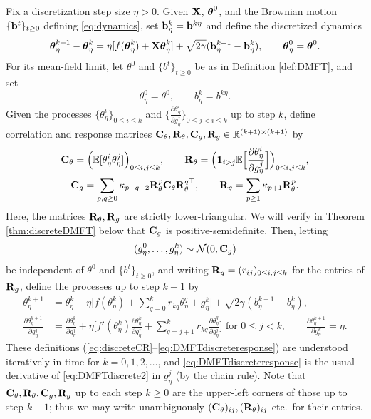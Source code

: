 Fix a discretization step size $\eta>0$. Given $\mathbf{X}$, $\boldsymbol{\theta}^0$, and the
Brownian motion $\{\mathbf{b}^t\}_{t \geq 0}$ defining \eqref{eq:dynamics},
set $\mathbf{b}_\eta^k=\mathbf{b}^{k\eta}$ and define the discretized dynamics 
\begin{equation}\label{eq:disc-Langevin}
\boldsymbol{\theta}^{k+1}_\eta-\boldsymbol{\theta}^{k}_\eta=\eta[f(\boldsymbol{\theta}^{k}_\eta)+\mathbf{X}\boldsymbol{\theta}^{k}_\eta]
+ \sqrt{2\gamma} (\mathbf{b}^{k+1}_\eta - \mathbf{b}^{k}_\eta),
\qquad \boldsymbol{\theta}_\eta^0=\boldsymbol{\theta}^0.
\end{equation}
For its mean-field limit, let $\theta^0$ and $\{b^t\}_{t \geq 0}$ be as in
Definition \ref{def:DMFT}, and set
\[\theta_\eta^0=\theta^0, \qquad b_\eta^k=b^{k\eta}.\]
Given the processes $\{\theta_\eta^i\}_{0 \leq i \leq k}$
and $\{\frac{\partial \theta_\eta^i}{\partial g_\eta^j}\}_{0 \leq j<i \leq k}$
up to step $k$, define correlation and response matrices 
$\mathbf{C}_\theta,\mathbf{R}_\theta,\mathbf{C}_g,\mathbf{R}_g \in \mathbb{R}^{(k+1) \times (k+1)}$ by
\begin{equation}\label{eq:discreteCR}
\begin{gathered}
\mathbf{C}_\theta=\Big(\mathbb{E}[\theta^{i}_\eta\theta^{j}_\eta]\Big)_{0 \leq i,j \leq k},
\qquad \mathbf{R}_\theta=\Big(\mathbf{1}_{i>j}\mathbb{E}\Big[\frac{\partial
\theta^i_\eta}{\partial g^j_\eta}\Big]\Big)_{0 \leq i,j \leq k},\\
\mathbf{C}_g=\sum_{p,q\ge 0} \kappa_{p+q+2}
\mathbf{R}_\theta^p\mathbf{C}_\theta\mathbf{R}_\theta^{q\top},
\qquad \mathbf{R}_g=\sum_{p \geq 1} \kappa_{p+1}\mathbf{R}_\theta^p.
\end{gathered}
\end{equation}
Here, the matrices $\mathbf{R}_\theta,\mathbf{R}_g$ are strictly lower-triangular.
We will verify in Theorem \ref{thm:discreteDMFT} below that
$\mathbf{C}_g$ is positive-semidefinite. Then, letting
\begin{equation}\label{eq:discreteg}
(g^0_\eta,\ldots,g^k_\eta) \sim \mathcal{N}(0,\mathbf{C}_g)
\end{equation}
be independent of $\theta^0$ and $\{b^t\}_{t \geq 0}$, and writing
$\mathbf{R}_g=(r_{ij})_{0 \leq i,j \leq k}$ for the entries of $\mathbf{R}_g$, define
the processes up to step $k+1$ by
\begin{align}
\theta^{k+1}_\eta
&=\theta^{k}_\eta + \eta\Big[f(\theta^{k}_\eta)+\sum_{q=0}^k r_{kq}\theta^{q}_\eta+g^{k}_\eta\Big] + \sqrt{2\gamma} (b^{k+1}_\eta - b^{k}_\eta),\label{eq:DMFTdiscrete2}\\ 
\frac{\partial \theta^{k+1}_\eta}{\partial g^{j}_\eta}  
&=\frac{\partial \theta^{k}_\eta}{\partial g^{j}_\eta}+\eta\Big[f'(\theta^{k}_\eta)\frac{\partial \theta^{k}_\eta}{\partial g^{j}_\eta}
+ \sum_{q=j+1}^k r_{kq}\frac{\partial \theta^{q}_\eta}{\partial
g^{j}_\eta}\Big] \text{ for } 0 \leq j < k,
\qquad \frac{\partial \theta^{k+1}_\eta}{\partial
g^{k}_\eta}=\eta.\label{eq:DMFTdiscreteresponse}
\end{align}
These definitions (\ref{eq:discreteCR}--\ref{eq:DMFTdiscreteresponse})
are understood iteratively in time for $k=0,1,2,\ldots$, and
\eqref{eq:DMFTdiscreteresponse} is the usual derivative
of \eqref{eq:DMFTdiscrete2} in $g_\eta^j$ (by the chain rule). 
Note that $\mathbf{C}_\theta,\mathbf{R}_\theta,\mathbf{C}_g,\mathbf{R}_g$ up to each step $k \geq 0$
are the upper-left corners of those up to step $k+1$; thus we may write
unambiguously $(\mathbf{C}_\theta)_{ij},(\mathbf{R}_\theta)_{ij}$ etc.\ for their entries.

